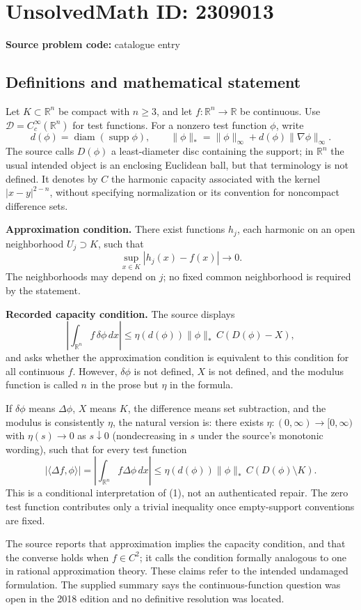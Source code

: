 \documentclass[11pt]{article}
\newcommand{\R}{\mathbb{R}}
\begin{document}
\section*{UnsolvedMath ID: 2309013}
\textbf{Source problem code:} catalogue entry
\subsection{Definitions and mathematical statement}
Let $K\subset\R^n$ be compact with $n\geq3$, and let $f:\R^n\to\R$ be continuous. Use $\mathcal D=C_c^\infty(\R^n)$ for test functions. For a nonzero test function $\phi$, write
\[
 d(\phi)=\operatorname{diam}(\operatorname{supp}\phi),\qquad
 \|\phi\|_*=\|\phi\|_\infty+d(\phi)\|\nabla\phi\|_\infty.
\]
The source calls $D(\phi)$ a least-diameter disc containing the support; in $\R^n$ the usual intended object is an enclosing Euclidean ball, but that terminology is not defined. It denotes by $C$ the harmonic capacity associated with the kernel $|x-y|^{2-n}$, without specifying normalization or its convention for noncompact difference sets.

\textbf{Approximation condition.} There exist functions $h_j$, each harmonic on an open neighborhood $U_j\supset K$, such that
\[
 \sup_{x\in K}|h_j(x)-f(x)|\longrightarrow0.
\]
The neighborhoods may depend on $j$; no fixed common neighborhood is required by the statement.

\textbf{Recorded capacity condition.} The source displays
\[
 \left|\int_{\R^n}f\,\delta\phi\,dx\right|
 \leq\eta(d(\phi))\|\phi\|_*\,C(D(\phi)-X), \tag{1}
\]
and asks whether the approximation condition is equivalent to this condition for all continuous $f$. However, $\delta\phi$ is not defined, $X$ is not defined, and the modulus function is called $n$ in the prose but $\eta$ in the formula.

If $\delta\phi$ means $\Delta\phi$, $X$ means $K$, the difference means set subtraction, and the modulus is consistently $\eta$, the natural version is: there exists $\eta:(0,\infty)\to[0,\infty)$ with $\eta(s)\to0$ as $s\downarrow0$ (nondecreasing in $s$ under the source's monotonic wording), such that for every test function
\[
 |\langle\Delta f,\phi\rangle|
 =\left|\int_{\R^n}f\Delta\phi\,dx\right|
 \leq\eta(d(\phi))\|\phi\|_*\,C(D(\phi)\setminus K). \tag{2}
\]
This is a conditional interpretation of (1), not an authenticated repair. The zero test function contributes only a trivial inequality once empty-support conventions are fixed.

The source reports that approximation implies the capacity condition, and that the converse holds when $f\in C^2$; it calls the condition formally analogous to one in rational approximation theory. These claims refer to the intended undamaged formulation. The supplied summary says the continuous-function question was open in the 2018 edition and no definitive resolution was located.
\end{document}
